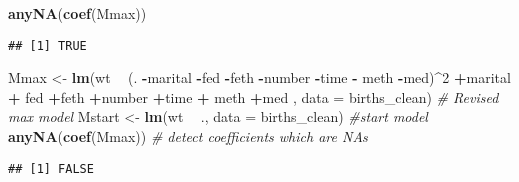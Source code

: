 \documentclass[]{article}
\newenvironment{Shaded}{\begin{snugshade}}{\end{snugshade}}
\newcommand{\KeywordTok}[1]{\textcolor[rgb]{0.13,0.29,0.53}{\textbf{#1}}}
\newcommand{\DataTypeTok}[1]{\textcolor[rgb]{0.13,0.29,0.53}{#1}}
\newcommand{\DecValTok}[1]{\textcolor[rgb]{0.00,0.00,0.81}{#1}}
\newcommand{\StringTok}[1]{\textcolor[rgb]{0.31,0.60,0.02}{#1}}
\newcommand{\CommentTok}[1]{\textcolor[rgb]{0.56,0.35,0.01}{\textit{#1}}}
\newcommand{\OperatorTok}[1]{\textcolor[rgb]{0.81,0.36,0.00}{\textbf{#1}}}
\newcommand{\NormalTok}[1]{#1}
\begin{document}
\begin{Shaded}
\begin{Highlighting}[]
\KeywordTok{anyNA}\NormalTok{(}\KeywordTok{coef}\NormalTok{(Mmax))}
\end{Highlighting}
\end{Shaded}

\begin{verbatim}
## [1] TRUE
\end{verbatim}

\begin{Shaded}
\begin{Highlighting}[]
\NormalTok{Mmax <-}\StringTok{ }\KeywordTok{lm}\NormalTok{(wt }\OperatorTok{~}\StringTok{ }\NormalTok{(. }\OperatorTok{-}\NormalTok{marital }\OperatorTok{-}\NormalTok{fed }\OperatorTok{-}\NormalTok{feth }\OperatorTok{-}\NormalTok{number }\OperatorTok{-}\NormalTok{time }\OperatorTok{-}\StringTok{ }\NormalTok{meth }\OperatorTok{-}\NormalTok{med)}\OperatorTok{^}\DecValTok{2} 
           \OperatorTok{+}\NormalTok{marital }\OperatorTok{+}\StringTok{ }\NormalTok{fed }\OperatorTok{+}\NormalTok{feth }\OperatorTok{+}\NormalTok{number }\OperatorTok{+}\NormalTok{time }\OperatorTok{+}\StringTok{ }\NormalTok{meth }\OperatorTok{+}\NormalTok{med , }\DataTypeTok{data =}\NormalTok{ births_clean) }\CommentTok{# Revised max model}
\NormalTok{Mstart <-}\StringTok{ }\KeywordTok{lm}\NormalTok{(wt }\OperatorTok{~}\StringTok{ }\NormalTok{., }\DataTypeTok{data =}\NormalTok{ births_clean) }\CommentTok{#start model}
\KeywordTok{anyNA}\NormalTok{(}\KeywordTok{coef}\NormalTok{(Mmax)) }\CommentTok{# detect coefficients which are NAs}
\end{Highlighting}
\end{Shaded}

\begin{verbatim}
## [1] FALSE
\end{verbatim}
\end{document}
